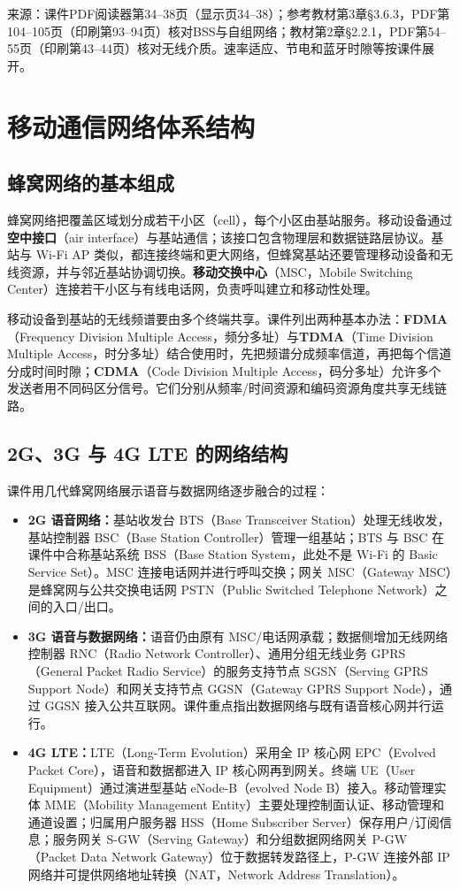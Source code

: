 \annotationarea[4]
\small 来源：课件PDF阅读器第34--38页（显示页34--38）；参考教材第3章§3.6.3，PDF第104--105页（印刷第93--94页）核对BSS与自组网络；教材第2章§2.2.1，PDF第54--55页（印刷第43--44页）核对无线介质。速率适应、节电和蓝牙时隙等按课件展开。\normalsize

\section{移动通信网络体系结构}
\subsection{蜂窝网络的基本组成}
蜂窝网络把覆盖区域划分成若干小区（cell），每个小区由基站服务。移动设备通过\textbf{空中接口}（air interface）与基站通信；该接口包含物理层和数据链路层协议。基站与 Wi-Fi AP 类似，都连接终端和更大网络，但蜂窝基站还要管理移动设备和无线资源，并与邻近基站协调切换。\textbf{移动交换中心}（MSC，Mobile Switching Center）连接若干小区与有线电话网，负责呼叫建立和移动性处理。

移动设备到基站的无线频谱要由多个终端共享。课件列出两种基本办法：\textbf{FDMA}（Frequency Division Multiple Access，频分多址）与\textbf{TDMA}（Time Division Multiple Access，时分多址）结合使用时，先把频谱分成频率信道，再把每个信道分成时间时隙；\textbf{CDMA}（Code Division Multiple Access，码分多址）允许多个发送者用不同码区分信号。它们分别从频率/时间资源和编码资源角度共享无线链路。

\subsection{2G、3G 与 4G LTE 的网络结构}
课件用几代蜂窝网络展示语音与数据网络逐步融合的过程：
\begin{itemize}[nosep]
  \item \textbf{2G 语音网络：}基站收发台 BTS（Base Transceiver Station）处理无线收发，基站控制器 BSC（Base Station Controller）管理一组基站；BTS 与 BSC 在课件中合称基站系统 BSS（Base Station System，此处不是 Wi-Fi 的 Basic Service Set）。MSC 连接电话网并进行呼叫交换；网关 MSC（Gateway MSC）是蜂窝网与公共交换电话网 PSTN（Public Switched Telephone Network）之间的入口/出口。
  \item \textbf{3G 语音与数据网络：}语音仍由原有 MSC/电话网承载；数据侧增加无线网络控制器 RNC（Radio Network Controller）、通用分组无线业务 GPRS（General Packet Radio Service）的服务支持节点 SGSN（Serving GPRS Support Node）和网关支持节点 GGSN（Gateway GPRS Support Node），通过 GGSN 接入公共互联网。课件重点指出数据网络与既有语音核心网并行运行。
  \item \textbf{4G LTE：}LTE（Long-Term Evolution）采用全 IP 核心网 EPC（Evolved Packet Core），语音和数据都进入 IP 核心网再到网关。终端 UE（User Equipment）通过演进型基站 eNode-B（evolved Node B）接入。移动管理实体 MME（Mobility Management Entity）主要处理控制面认证、移动管理和通道设置；归属用户服务器 HSS（Home Subscriber Server）保存用户/订阅信息；服务网关 S-GW（Serving Gateway）和分组数据网络网关 P-GW（Packet Data Network Gateway）位于数据转发路径上，P-GW 连接外部 IP 网络并可提供网络地址转换（NAT，Network Address Translation）。
\end{itemize}

